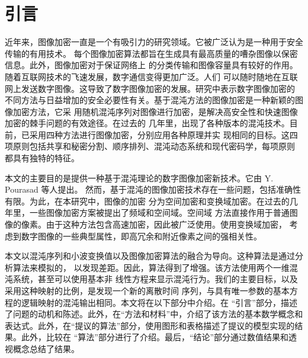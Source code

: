 \chapter{引言}

近年来，图像加密一直是一个有吸引力的研究领域。它被广泛认为是一种用于安全传输的有用技术。
每个图像加密算法都旨在生成具有最高质量的嘈杂图像以保密信息。此外，图像加密对于保证网络上
的分类传输和图像容量具有较好的作用。随着互联网技术的飞速发展，数字通信变得更加广泛。人们
可以随时随地在互联网上发送数字图像。这导致了数字图像加密的发展。研究中表示数字图像加密的
不同方法与日益增加的安全必要性有关。基于混沌方法的图像加密是一种新颖的图像加密方法，它采
用随机混沌序列对图像进行加密，是解决高安全性和快速图像加密的棘手问题的有效途径。在过去的
几年里，出现了各种版本的混沌技术。目前，已采用四种方法进行图像加密，分别应用各种原理并实
现相同的目标。这四项原则包括共享和秘密分割、顺序排列、混沌动态系统和现代密码学，每项原则
都具有独特的特征。\citep{fu2012chaos}\par
本文的主要目的是提供一种基于混沌理论的数字图像加密新技术。它由 Y. Pourasad 等人提出。
然而，基于混沌的图像加密技术存在一些问题，包括准确性有限。为此，在本研究中，图像的加密
分为空间加密和变换域加密。在过去的几年里，一些图像加密方案被提出了频域和空间域。空间域
方法直接作用于普通图像的像素。\citep{yun2009digital, wang2008digital}由于这种方法包含高速加密，因此被广泛使用。使用变换域加密，
考虑到数字图像的一些典型属性，即高冗余和附近像素之间的强相关性。\par
本文以混沌序列和小波变换值以及图像加密算法的融合为导向。这种算法是通过分析算法来模拟的，
以发现差距。因此，算法得到了增强。该方法使用两个一维混沌系统，甚至可以使用基本非
线性方程来显示混沌行为。我们的主要目标，以及采用这种映射的比例，是发现一个新的离散时间
序列，与具有唯一参数的基本方程的逻辑映射的混沌输出相同。本文将在以下部分中介绍。在
“引言”部分，描述了问题的动机和陈述。此外，在“方法和材料”中，介绍了该方法的基本数学概念和
表达式。此外，在“提议的算法”部分，使用图形和表格描述了提议的模型实现的结果。此外，比较在
“算法”部分进行了介绍。最后，“结论”部分通过数值结果和透视概念总结了结果。\citep{yun2009digital, pourasad2021new}